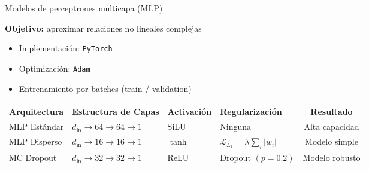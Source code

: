 \documentclass[10pt, aspectratio=169]{beamer}
\begin{document}
\begin{frame}{Modelos de perceptrones multicapa (MLP)}

\textbf{Objetivo:} aproximar relaciones no lineales complejas  

\begin{itemize}
    \item Implementación: \texttt{PyTorch}
    \item Optimización: \texttt{Adam}
    \item Entrenamiento por batches (train / validation)
\end{itemize}

\vspace{0.2cm}
\begin{center}
\begin{tabular}{llllc}
    \toprule
    \textbf{Arquitectura} & \textbf{Estructura de Capas} & \textbf{Activación} & \textbf{Regularización} & \textbf{Resultado}\\
    \midrule
    MLP Estándar & $d_\text{in} \!\to\! 64 \!\to\! 64 \!\to\! 1$  & SiLU    & Ninguna & Alta capacidad\\
    MLP Disperso & $d_\text{in} \!\to\! 16 \!\to\! 16 \!\to\! 1$  & $\tanh$ & $\mathcal{L}_{L_1}=\lambda\sum_i|w_i|$ & Modelo simple \\
    MC Dropout   & $d_\text{in} \!\to\! 32 \!\to\! 32 \!\to\! 1$  & ReLU    & Dropout $(p=0.2)$ & Modelo robusto\\
    \bottomrule
\end{tabular}
\end{center}




\end{frame}
\end{document}
